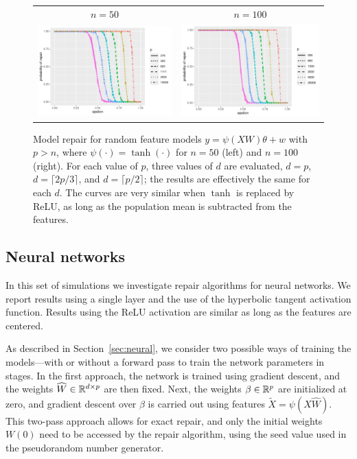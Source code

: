 \begin{figure}[ht]
  \begin{center}
    \begin{tabular}{cc}
      {\scriptsize $n=50$} & {\scriptsize $n=100$} \\
      \includegraphics[width=.47\textwidth]{figures/fig6a} &
      \includegraphics[width=.47\textwidth]{figures/fig6b}\\[-10pt]
    \end{tabular}
  \end{center}
\caption{Model repair for random feature models $y=\psi(XW)\theta + w$ with $p>n$, where $\psi(\cdot) = \tanh(\cdot)$
for $n=50$ (left) and $n=100$ (right). For each value of $p$, three values of $d$ are evaluated, $d=p$, $d=\lceil 2p/3\rceil$,
and $d=\lceil p/2\rceil$; the results are effectively the same for each $d$. The curves are very similar when $\tanh$ is replaced by ReLU, as long as the population mean is subtracted from the features.}
\label{fig:rf}
\end{figure}

\subsection{Neural networks}
\vskip10pt

In this set of simulations we investigate repair algorithms for neural networks. We report results using a single layer and the use of the hyperbolic tangent activation function. Results using the ReLU activation are similar as long as the features are centered.

As described in Section~\ref{sec:neural}, we consider two possible ways of training the models---with or without a forward pass to train the network parameters in stages. In the first approach, the network is trained using gradient descent, and the weights $\widehat W\in\mathbb{R}^{d\times p}$ are then fixed. Next, the weights $\beta\in\mathbb{R}^p$ are initialized at zero, and gradient descent over $\beta$ is carried out using features
$\tilde X = \psi(X\hat W)$. This two-pass approach allows for exact repair, and only the initial weights $W(0)$ need to be accessed by the repair algorithm, using the seed value used in the pseudorandom number generator.

